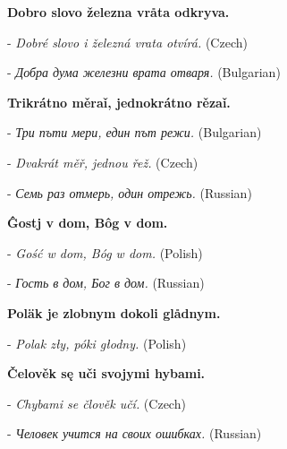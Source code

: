 \textbf{Dobro slovo železna vråta odkryva.}

- \textit{Dobré slovo i železná vrata otvírá.} (Czech)

- \textit{Добра дума железни врата отваря.} (Bulgarian)

\textbf{Trikrátno měraǐ, jednokrátno rězaǐ.}

- \textit{Три пъти мери, един път режи.} (Bulgarian)

- \textit{Dvakrát měř, jednou řež.} (Czech)

- \textit{Семь раз отмерь, один отрежь.} (Russian)

\textbf{Ĝostj v dom, Bôg v dom.}

- \textit{Gość w dom, Bóg w dom.} (Polish)

- \textit{Гость в дом, Бог в дом.} (Russian)

\textbf{Poläk je zlobnym dokoli glådnym.}

- \textit{Polak zły, póki głodny.} (Polish)

\textbf{Čelověk sę uči svojymi hybami.}

- \textit{Chybami se člověk učí.} (Czech)

- \textit{Человек учится на своих ошибках.} (Russian)
